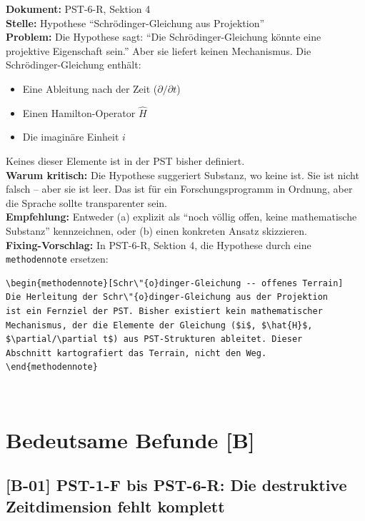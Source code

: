 \documentclass[11pt,a4paper]{article}
\newcommand{\B}[1]{\textbf{[B-#1]}}
\newcommand{\Dok}[1]{\textbf{Dokument:} #1\\}
\newcommand{\Stelle}[1]{\textbf{Stelle:} #1\\}
\newcommand{\Prob}[1]{\textbf{Problem:} #1\\}
\newcommand{\Krit}[1]{\textbf{Warum kritisch:} #1\\}
\newcommand{\Empf}[1]{\textbf{Empfehlung:} #1\\}
\newcommand{\Fix}[1]{\textbf{Fixing-Vorschlag:} #1\\}
\begin{document}
\Dok{PST-6-R, Sektion 4}
\Stelle{Hypothese ``Schr\"{o}dinger-Gleichung aus Projektion''}
\Prob{Die Hypothese sagt: ``Die Schr\"{o}dinger-Gleichung k\"{o}nnte
eine projektive Eigenschaft sein.'' Aber sie liefert keinen
Mechanismus. Die Schr\"{o}dinger-Gleichung enth\"{a}lt:
\begin{itemize}
  \item Eine Ableitung nach der Zeit ($\partial/\partial t$)
  \item Einen Hamilton-Operator $\hat{H}$
  \item Die imagin\"{a}re Einheit $i$
\end{itemize}
Keines dieser Elemente ist in der PST bisher definiert.}
\Krit{Die Hypothese suggeriert Substanz, wo keine ist. Sie ist nicht
falsch -- aber sie ist leer. Das ist f\"{u}r ein Forschungsprogramm in
Ordnung, aber die Sprache sollte transparenter sein.}
\Empf{Entweder (a) explizit als ``noch v\"{o}llig offen, keine
mathematische Substanz'' kennzeichnen, oder (b) einen konkreten
Ansatz skizzieren.}
\Fix{In PST-6-R, Sektion 4, die Hypothese durch eine
\texttt{methodennote} ersetzen:
\begin{verbatim}
\begin{methodennote}[Schr\"{o}dinger-Gleichung -- offenes Terrain]
Die Herleitung der Schr\"{o}dinger-Gleichung aus der Projektion
ist ein Fernziel der PST. Bisher existiert kein mathematischer
Mechanismus, der die Elemente der Gleichung ($i$, $\hat{H}$,
$\partial/\partial t$) aus PST-Strukturen ableitet. Dieser
Abschnitt kartografiert das Terrain, nicht den Weg.
\end{methodennote}
\end{verbatim}}

\newpage

\section{Bedeutsame Befunde [B]}

\subsection{\B{01} PST-1-F bis PST-6-R: Die destruktive Zeitdimension
fehlt komplett}
\end{document}
